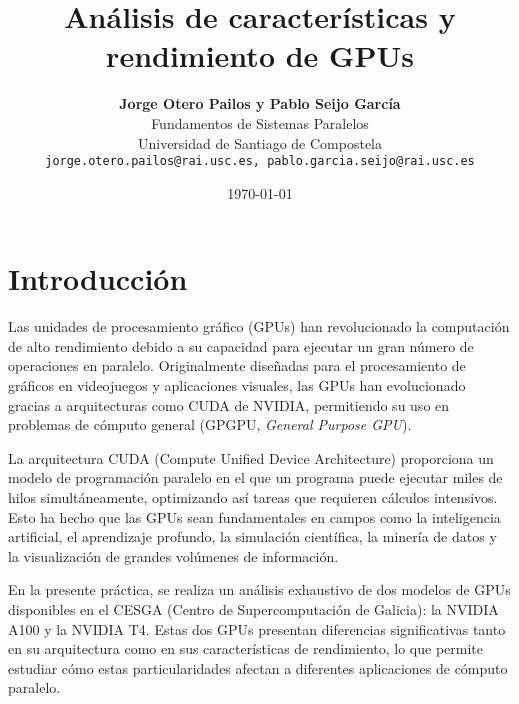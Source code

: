 \documentclass[twocolumn,a4paper,12pt]{article}
\title{\textbf{Análisis de características y rendimiento de GPUs}}
\author{
\textbf{Jorge Otero Pailos y Pablo Seijo García} \\  %
\small{Fundamentos de Sistemas Paralelos} \\ %
\small{Universidad de Santiago de Compostela} \\ %
\small{\texttt{jorge.otero.pailos@rai.usc.es, pablo.garcia.seijo@rai.usc.es}} %
}
\date{\today} %
\begin{document}


\section{Introducción}
Las unidades de procesamiento gráfico (GPUs) han revolucionado la computación de alto rendimiento debido a su capacidad para ejecutar un gran número de operaciones en paralelo. Originalmente diseñadas para el procesamiento de gráficos en videojuegos y aplicaciones visuales, las GPUs han evolucionado gracias a arquitecturas como CUDA de NVIDIA, permitiendo su uso en problemas de cómputo general (GPGPU, \textit{General Purpose GPU}). 

La arquitectura CUDA (Compute Unified Device Architecture) proporciona un modelo de programación paralelo en el que un programa puede ejecutar miles de hilos simultáneamente, optimizando así tareas que requieren cálculos intensivos. Esto ha hecho que las GPUs sean fundamentales en campos como la inteligencia artificial, el aprendizaje profundo, la simulación científica, la minería de datos y la visualización de grandes volúmenes de información.

En la presente práctica, se realiza un análisis exhaustivo de dos modelos de GPUs disponibles en el CESGA (Centro de Supercomputación de Galicia): la NVIDIA A100 y la NVIDIA T4. Estas dos GPUs presentan diferencias significativas tanto en su arquitectura como en sus características de rendimiento, lo que permite estudiar cómo estas particularidades afectan a diferentes aplicaciones de cómputo paralelo.
\end{document}
